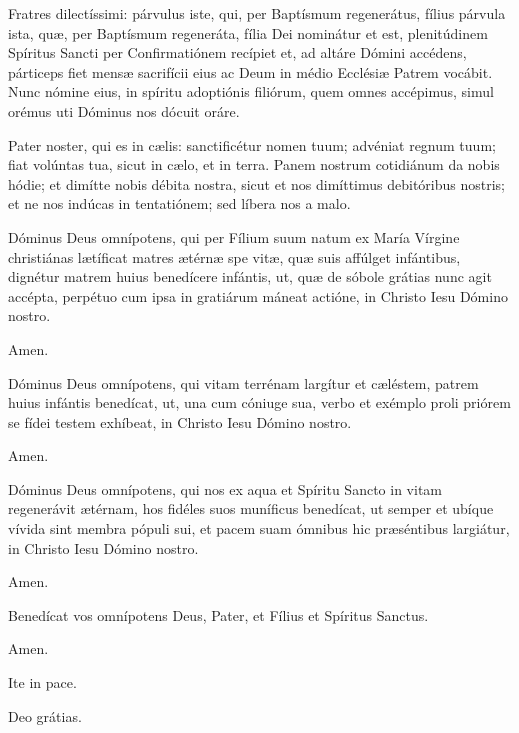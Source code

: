 

Fratres dilectíssimi:
\ifparvulus
párvulus iste, qui, per Baptísmum regenerátus, fílius
\else
párvula ista, quæ, per Baptísmum regeneráta, fília
\fi
Dei nominátur et est, plenitúdinem Spíritus
Sancti per Confirmatiónem recípiet et, ad altáre Dómini accédens,
párticeps fiet mensæ sacrifícii eius ac Deum in médio
Ecclésiæ Patrem vocábit. Nunc nómine eius, in spíritu adoptiónis
filiórum, quem omnes accépimus, simul orémus uti Dóminus nos dócuit
oráre.

Pater noster, qui es in cælis:
sanctificétur nomen tuum;
advéniat regnum tuum;
fiat volúntas tua, sicut in cælo, et in terra.
Panem nostrum cotidiánum da nobis hódie;
et dimítte nobis débita nostra,
sicut et nos dimíttimus debitóribus nostris;
et ne nos indúcas in tentatiónem;
sed líbera nos a malo.



Dóminus Deus omnípotens, qui per Fílium suum natum ex María Vírgine christiánas
lætíficat matres ætérnæ spe vitæ, quæ suis affúlget infántibus, dignétur matrem huius
benedícere infántis, ut, quæ de sóbole grátias nunc agit accépta, perpétuo cum ipsa
in gratiárum máneat actióne, in Christo Iesu Dómino nostro.

 Amen.

 Dóminus Deus omnípotens, qui vitam terrénam largítur et cæléstem, patrem huius infántis
benedícat, ut, una cum cóniuge sua, verbo et exémplo proli priórem se fídei testem exhíbeat,
in Christo Iesu Dómino nostro.

 Amen.

 Dóminus Deus omnípotens, qui nos ex aqua et Spíritu Sancto in vitam regenerávit
ætérnam, hos fidéles suos muníficus benedícat, ut semper et ubíque vívida sint membra pópuli sui,
et pacem suam ómnibus hic præséntibus largiátur, in Christo Iesu Dómino nostro.

 Amen.

 Benedícat vos omnípotens Deus,
Pater, et Fílius \grecross{} et Spíritus Sanctus.

 Amen.

 Ite in pace.

 Deo grátias.
